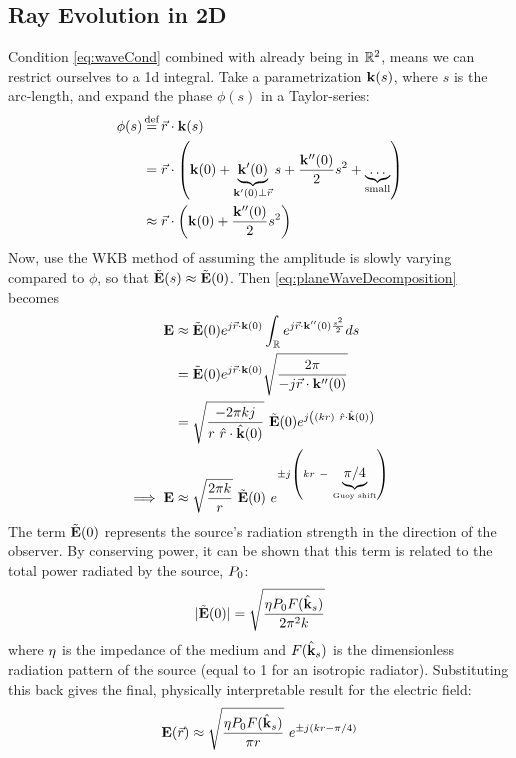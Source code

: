 \documentclass{article}
\begin{document}
\subsection{Ray Evolution in 2D}
Condition \eqref{eq:waveCond} combined with already being in $\mathbb{R}^2$, means we can
restrict ourselves to a 1d integral. Take a parametrization $\mathbf{k}(s)$, where $s$
is the arc-length, and expand the phase $\phi(s)$ in a Taylor-series:
\begin{align}
   \phi(s) & \defeq \pos \cdot \wavevec (s) \nonumber \\
   &= \pos \cdot \left( \wavevec( 0 ) + \underbrace{\wavevec'(0)}_{\wavevec'(0) \perp
      \pos} s + \frac{\wavevec''(0)}{2} s^2 + \underbrace{\ldots}_{\text{small}}
      \right) \nonumber \\
   & \approx \pos \cdot \left( \wavevec(0) + \frac{\wavevec ''(0)}{2} s^2 \right)
   \label{eq:taylorPhi}
\end{align}
Now, use the WKB method of assuming the amplitude is slowly varying compared to
$\phi$, so that $\tilde{\mathbf{E}}(s) \approx \tilde{\mathbf{E}}(0)$. Then
\eqref{eq:planeWaveDecomposition} becomes
\begin{align}
   \eFreq & \approx \eFreqMom (0) e^{\im \pos \cdot \wavevec(0)} \int_{\reals}
      e^{\im \pos \cdot \wavevec'' (0) \frac{s^2}{2}} ds \nonumber \\
   &= \eFreqMom (0) e^{\im \pos \cdot \wavevec(0)} \sqrt{\frac{2\pi}{-j
      \pos \cdot \wavevec''(0)}} \nonumber \\
   &= \sqrt{\frac{-2 \pi \dispRel \im }{ \posMag \ \posNorm \cdot
      \wavevecNorm( 0 ) }} \ \eFreqMom (0) e^{\im \left( \left( \dispRel
      \posMag \right) \ \posNorm \cdot \wavevecNorm(0) \right)} \nonumber \\
   \implies \eFreq & \approx \sqrt{\frac{2 \pi \dispRel}{\posMag}} \ \eFreqMom(0) \
      e^{\pm \im \left( \dispRel \posMag \ - \ \underbrace{\pi/4}_{\text{Guoy shift}}
      \right) }
\end{align}
The term $\tilde{\mathbf{E}}(0)$ represents the source's radiation strength in the direction
of the observer. By conserving power, it can be shown that this term is related to
the total power radiated by the source, $P_0$:
\begin{equation}
   |\tilde{\mathbf{E}}(0)| = \sqrt{\frac{\eta P_0 F(\hat{\mathbf{k}}_s)}{2\pi^2 k}}
\end{equation}
where $\eta$ is the impedance of the medium and $F(\hat{\mathbf{k}}_s)$ is the dimensionless radiation pattern of the source (equal to 1 for an isotropic radiator). Substituting this back gives the final, physically interpretable result for the electric field:
\begin{equation}
   \mathbf{E}(\vec{r}) \approx \sqrt{\frac{\eta P_0 F(\hat{\mathbf{k}}_s)}{\pi
     r}} \ e^{ \pm j \left( k r - \pi/4 \right)}
   \label{eq:rayEvolution2d}
\end{equation}
\end{document}
